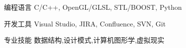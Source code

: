 


\begin{cvskills}


\cvskill
{编程语言} %
{C/C++, OpenGL/GLSL, STL/BOOST, Python} %


\cvskill
{开发工具} %
{Visual Studio, JIRA, Confluence, SVN, Git} %


\cvskill
{专业技能} %
{数据结构,设计模式,计算机图形学,虚拟现实} %

\end{cvskills}